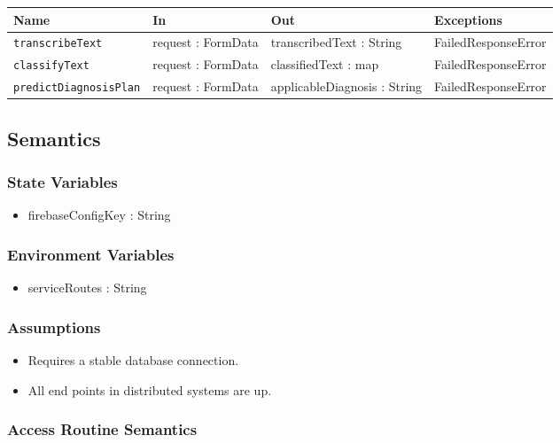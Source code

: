 \documentclass[12pt, titlepage]{article}
\begin{document}
\begin{center}
\begin{tabular}{p{4cm} p{3cm} p{4cm} p{3.5cm}}
\hline
\textbf{Name} & \textbf{In} & \textbf{Out} & \textbf{Exceptions} \\
\hline
\texttt{transcribeText} & request : FormData & transcribedText : String & FailedResponseError \\
\texttt{classifyText} & request : FormData & classifiedText : map  & FailedResponseError \\
\texttt{predictDiagnosisPlan} & request : FormData & applicableDiagnosis : String & FailedResponseError \\
\hline
\end{tabular}
\end{center}

\subsection{Semantics}

\subsubsection{State Variables}

\begin{itemize}
  \item firebaseConfigKey : String 
\end{itemize}

\subsubsection{Environment Variables}
\begin{itemize}
  \item serviceRoutes : String
\end{itemize}

\subsubsection{Assumptions}

\begin{itemize}
  \item Requires a stable database connection.
  \item All end points in distributed systems are up.
\end{itemize}

\subsubsection{Access Routine Semantics}
\end{document}
